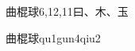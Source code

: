\begin{entry}{曲棍球}{6,12,11}{⽈、⽊、⽟}
  \begin{phonetics}{曲棍球}{qu1gun4qiu2}
  \end{phonetics}
\end{entry}
